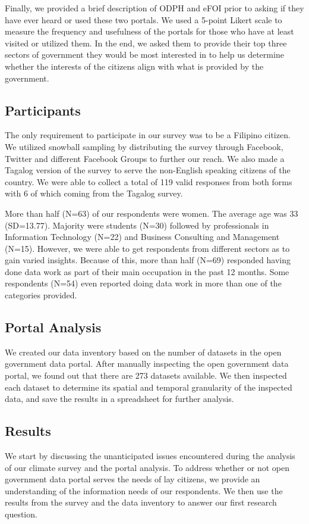 \documentclass{sigchi}
\begin{document}
Finally, we provided a brief description of ODPH and eFOI prior to asking if they have ever heard or used these two portals. We used a 5-point Likert scale to measure the frequency and usefulness of the portals for those who have at least visited or utilized them. In the end, we asked them to provide their top three sectors of government they would be most interested in to help us determine whether the interests of the citizens align with what is provided by the government.

\subsection{Participants}
The only requirement to participate in our survey was to be a Filipino citizen. We utilized snowball sampling by distributing the survey through Facebook, Twitter and different Facebook Groups to further our reach. We also made a Tagalog version of the survey to serve the non-English speaking citizens of the country. We were able to collect a total of 119 valid responses from both forms with 6 of which coming from the Tagalog survey.

More than half (N=63) of our respondents were women. The average age was 33 (SD=13.77). Majority were students (N=30) followed by professionals in Information Technology (N=22) and Business Consulting and Management (N=15). However, we were able to get respondents from different sectors as to gain varied insights. Because of this, more than half (N=69) responded having done data work as part of their main occupation in the past 12 months. Some respondents (N=54) even reported doing data work in more than one of the categories provided.

\subsection{Portal Analysis}
We created our data inventory based on the number of datasets in the open government data portal. After manually inspecting the open government data portal, we found out that there are 273 datasets available. We then inspected each dataset to determine its spatial and temporal granularity of the inspected data, and save the results in a spreadsheet for further analysis.

\subsection{Results}
We start by discussing the unanticipated issues encountered during the analysis of our climate survey and the portal analysis. To address whether or not open government data portal serves the needs of lay citizens, we provide an understanding of the information needs of our respondents. We then use the results from the survey and the data inventory to answer our first research question.
\end{document}
